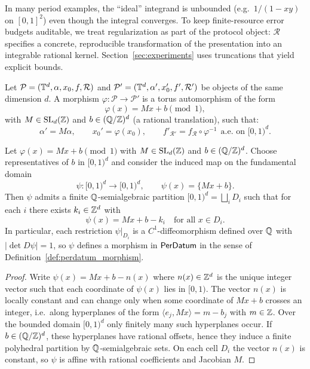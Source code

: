 \begin{remark}
\label{rem:regularization_component}
In many period examples, the ``ideal'' integrand is unbounded (e.g.\ $1/(1-xy)$ on $[0,1]^2$) even though the integral converges. To keep finite-resource error budgets auditable, we treat regularization as part of the protocol object: $\mathcal{R}$ specifies a concrete, reproducible transformation of the presentation into an integrable rational kernel. Section~\ref{sec:experiments} uses truncations that yield explicit bounds.
\end{remark}

\begin{definition}
\label{def:scan_alg_morphism}
Let $\mathcal{P}=(\mathbb{T}^d,\alpha,x_0,f,\mathcal{R})$ and $\mathcal{P}'=(\mathbb{T}^d,\alpha',x_0',f',\mathcal{R}')$ be objects of the same dimension $d$. A morphism $\varphi:\mathcal{P}\to\mathcal{P}'$ is a torus automorphism of the form
\begin{equation}
\label{eq:torus_auto}
\varphi(x)=Mx+b \pmod{1},
\end{equation}
with $M\in \mathrm{SL}_d(\mathbb{Z})$ and $b\in(\mathbb{Q}/\mathbb{Z})^d$ (a rational translation), such that:
\begin{equation}
\label{eq:intertwining_conditions}
\alpha' = M\alpha,\qquad x_0'=\varphi(x_0),\qquad f'_{\mathcal{R}'} = f_{\mathcal{R}}\circ \varphi^{-1}\ \ \text{a.e.\ on }[0,1)^d.
\end{equation}
\end{definition}

\begin{proposition}
\label{prop:rational_translation_perdatum}
Let $\varphi(x)=Mx+b \pmod{1}$ with $M\in \mathrm{SL}_d(\mathbb{Z})$ and $b\in(\mathbb{Q}/\mathbb{Z})^d$. Choose representatives of $b$ in $[0,1)^d$ and consider the induced map on the fundamental domain
\[
\psi:[0,1)^d\to[0,1)^d,\qquad \psi(x)=\{Mx+b\}.
\]
Then $\psi$ admits a finite $\mathbb{Q}$-semialgebraic partition $[0,1)^d=\bigsqcup_i D_i$ such that for each $i$ there exists $k_i\in\mathbb{Z}^d$ with
\[
\psi(x)=Mx+b-k_i\quad\text{for all }x\in D_i.
\]
In particular, each restriction $\psi|_{D_i}$ is a $C^1$-diffeomorphism defined over $\mathbb{Q}$ with $|\det D\psi|=1$, so $\psi$ defines a morphism in $\mathsf{PerDatum}$ in the sense of Definition~\ref{def:perdatum_morphism}.
\end{proposition}

\begin{proof}
Write $\psi(x)=Mx+b-n(x)$ where $n(x)\in\mathbb{Z}^d$ is the unique integer vector such that each coordinate of $\psi(x)$ lies in $[0,1)$. The vector $n(x)$ is locally constant and can change only when some coordinate of $Mx+b$ crosses an integer, i.e.\ along hyperplanes of the form $\langle e_j,Mx\rangle = m-b_j$ with $m\in\mathbb{Z}$. Over the bounded domain $[0,1)^d$ only finitely many such hyperplanes occur. If $b\in(\mathbb{Q}/\mathbb{Z})^d$, these hyperplanes have rational offsets, hence they induce a finite polyhedral partition by $\mathbb{Q}$-semialgebraic sets. On each cell $D_i$ the vector $n(x)$ is constant, so $\psi$ is affine with rational coefficients and Jacobian $M$.
\end{proof}

